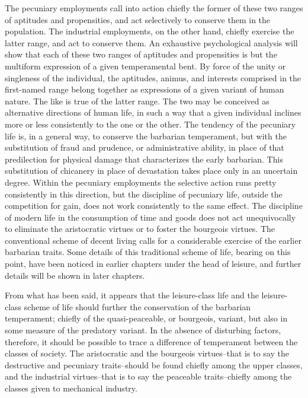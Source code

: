 \documentclass[12pt]{report}
\begin{document}
The pecuniary employments call into action chiefly the former of
these two ranges of aptitudes and propensities, and act selectively
to conserve them in the population. The industrial employments, on the
other hand, chiefly exercise the latter range, and act to conserve them.
An exhaustive psychological analysis will show that each of these two
ranges of aptitudes and propensities is but the multiform expression of
a given temperamental bent. By force of the unity or singleness of
the individual, the aptitudes, animus, and interests comprised in the
first-named range belong together as expressions of a given variant
of human nature. The like is true of the latter range. The two may be
conceived as alternative directions of human life, in such a way that
a given individual inclines more or less consistently to the one or
the other. The tendency of the pecuniary life is, in a general way, to
conserve the barbarian temperament, but with the substitution of fraud
and prudence, or administrative ability, in place of that predilection
for physical damage that characterizes the early barbarian. This
substitution of chicanery in place of devastation takes place only in an
uncertain degree. Within the pecuniary employments the selective action
runs pretty consistently in this direction, but the discipline of
pecuniary life, outside the competition for gain, does not work
consistently to the same effect. The discipline of modern life in the
consumption of time and goods does not act unequivocally to eliminate
the aristocratic virtues or to foster the bourgeois virtues. The
conventional scheme of decent living calls for a considerable exercise
of the earlier barbarian traits. Some details of this traditional scheme
of life, bearing on this point, have been noticed in earlier chapters
under the head of leisure, and further details will be shown in later
chapters.

From what has been said, it appears that the leisure-class life and
the leisure-class scheme of life should further the conservation of the
barbarian temperament; chiefly of the quasi-peaceable, or bourgeois,
variant, but also in some measure of the predatory variant. In the
absence of disturbing factors, therefore, it should be possible to
trace a difference of temperament between the classes of society. The
aristocratic and the bourgeois virtues--that is to say the destructive
and pecuniary traits--should be found chiefly among the upper classes,
and the industrial virtues--that is to say the peaceable traits--chiefly
among the classes given to mechanical industry.
\end{document}
